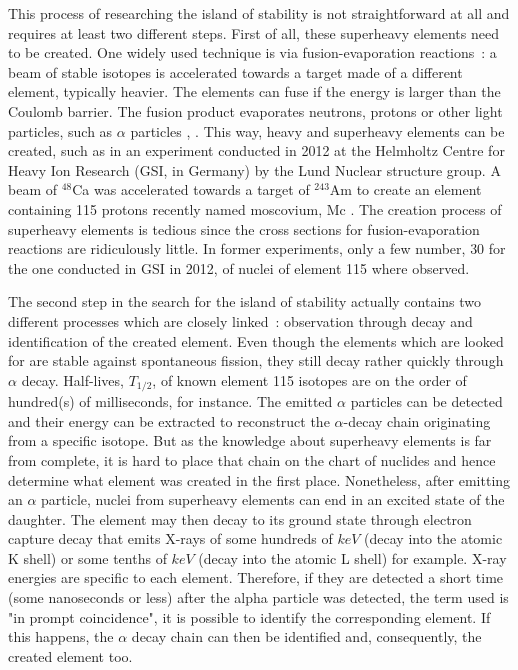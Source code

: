 \documentclass[11pt,a4paper]{article}
\begin{document}
This process of researching the island of stability is not straightforward at all and requires at least two different steps. First of all, these superheavy elements need to be created. One widely used technique is via fusion-evaporation reactions~: a beam of stable isotopes is accelerated towards a target made of a different element, typically heavier. The elements can fuse if the energy is larger than the Coulomb barrier. The fusion product evaporates neutrons, protons or other light particles, such as $\alpha$ particles \cite{Matti}, \cite{Thoen}. This way, heavy and superheavy elements can be created, such as in an experiment conducted in 2012 at the Helmholtz Centre for Heavy Ion Research (GSI, in Germany) by the Lund Nuclear structure group. A beam of $^{48}$Ca was accelerated towards a target of $^{243}$Am to create an element containing 115 protons recently named moscovium, Mc \cite{element115}.
The creation process of superheavy elements is tedious since the cross sections for fusion-evaporation reactions are ridiculously little. In former experiments, only a few number, $30$ for the one conducted in GSI in 2012, of nuclei of element 115 where observed.

The second step in the search for the island of stability actually contains two different processes which are closely linked~: observation through decay and identification of the created element. Even though the elements which are looked for are stable against spontaneous fission, they still decay rather quickly through $\alpha$ decay. Half-lives, $T_{1/2}$, of known element 115 isotopes are on the order of hundred(s) of milliseconds, for instance. The emitted $\alpha$ particles can be detected and their energy can be extracted to reconstruct the $\alpha$-decay chain originating from a specific isotope. But as the knowledge about superheavy elements is far from complete, it is hard to place that chain on the chart of nuclides and hence determine what element was created in the first place. Nonetheless, after emitting an $\alpha$ particle, nuclei from superheavy elements can end in an excited state of the daughter. The element may then decay to its ground state through electron capture decay that emits X-rays of some hundreds of $keV$ (decay into the atomic K shell) or some tenths of $keV$ (decay into the atomic L shell) for example. X-ray energies are specific to each element. Therefore, if they are detected a short time (some nanoseconds or less) after the alpha particle was detected, the term used is "in prompt coincidence", it is possible to identify the corresponding element. If this happens, the $\alpha$ decay chain can then be identified and, consequently, the created element too.
\end{document}
